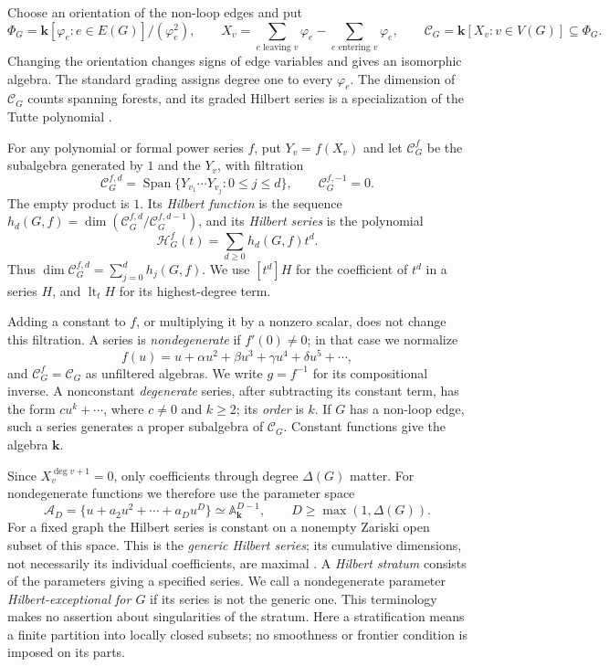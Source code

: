 \documentclass[reqno]{article}
\theoremstyle{plain} %
\theoremstyle{definition}
\theoremstyle{remark}
\DeclareMathOperator{\Span}{Span}
\newcommand{\K} {\mathbf{k}}
\newcommand {\CC}{\mathscr{C}}
\newcommand{\cA}{{\mathscr{A}}}
\newcommand{\hs}{\mathscr{H}}
\numberwithin{equation}{section}
\begin{document}
Choose an orientation of the non-loop edges and put
\[
 \Phi_G=\K[\varphi_e:e\in E(G)]/(\varphi_e^2),\qquad
 X_v=\sum_{e\text{ leaving }v}\varphi_e-
     \sum_{e\text{ entering }v}\varphi_e,\qquad
 \CC_G=\K[X_v:v\in V(G)]\subseteq\Phi_G.
\]
Changing the orientation changes signs of edge variables and gives an
isomorphic algebra. The standard grading assigns degree one to every
$\varphi_e$. The dimension of $\CC_G$ counts spanning forests, and its
graded Hilbert series is a specialization of the Tutte polynomial
\cite{PSS,PS,Wa1}.

For any polynomial or formal power series $f$, put $Y_v=f(X_v)$ and
let $\CC_G^f$ be the subalgebra generated by $1$ and the $Y_v$, with
filtration
\[
 \CC_G^{f,d}=\Span\{Y_{v_1}\cdots Y_{v_j}:0\le j\le d\},\qquad
 \CC_G^{f,-1}=0.
\]
The empty product is $1$. Its \emph{Hilbert function} is the sequence
$h_d(G,f)=\dim(\CC_G^{f,d}/\CC_G^{f,d-1})$, and its \emph{Hilbert
series} is the polynomial
\[
 \hs_G^f(t)=\sum_{d\ge0}h_d(G,f)t^d.
\]
Thus $\dim\CC_G^{f,d}=\sum_{j=0}^d h_j(G,f)$. We use $[t^d]H$ for
the coefficient of $t^d$ in a series $H$, and $\operatorname{lt}_tH$
for its highest-degree term.

Adding a constant to $f$, or multiplying it by a nonzero scalar, does
not change this filtration. A series is \emph{nondegenerate} if
$f'(0)\ne0$; in that case we normalize
\[
 f(u)=u+\alpha u^2+\beta u^3+\gamma u^4+\delta u^5+\cdots,
\]
and $\CC_G^f=\CC_G$ as unfiltered algebras. We write $g=f^{-1}$ for
its compositional inverse. A nonconstant \emph{degenerate} series, after
subtracting its constant term, has the form $cu^k+\cdots$, where
$c\ne0$ and $k\ge2$; its \emph{order} is $k$. If $G$ has a non-loop edge, such a series
generates a proper subalgebra of $\CC_G$. Constant functions give the algebra $\K$.

Since $X_v^{\deg v+1}=0$, only coefficients through degree $\Delta(G)$
matter. For nondegenerate functions we therefore use the parameter space
\[
 \cA_D=\{u+a_2u^2+\cdots+a_Du^D\}\simeq\mathbb A_\K^{D-1},
 \qquad D\ge\max(1,\Delta(G)).
\]
For a fixed graph the Hilbert series is constant on a nonempty Zariski
open subset of this space. This is the \emph{generic Hilbert series};
its cumulative dimensions, not necessarily its individual coefficients,
are maximal \cite[Proposition~3]{NSh}. A \emph{Hilbert stratum} consists
of the parameters giving a specified series. We call a nondegenerate
parameter \emph{Hilbert-exceptional for $G$} if its series is not the
generic one. This terminology makes no assertion about singularities
of the stratum. Here a stratification means a finite partition into
locally closed subsets; no smoothness or frontier condition is imposed
on its parts.
\end{document}
